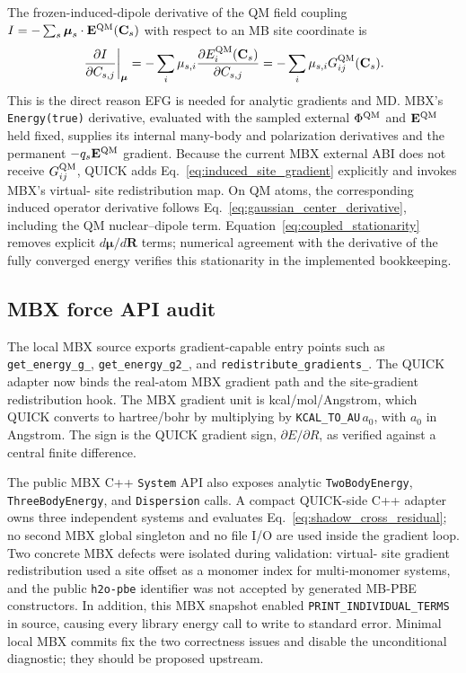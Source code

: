 \documentclass[11pt]{article}
\begin{document}
The frozen-induced-dipole derivative of the QM field coupling
$I=-\sum_s\boldsymbol{\mu}_s\cdot\mathbf{E}^{\rm QM}(\mathbf{C}_s)$ with
respect to an MB site coordinate is
\begin{equation}
  \left.
  \frac{\partial I}{\partial C_{s,j}}
  \right|_{\boldsymbol{\mu}}
  =
  -\sum_i \mu_{s,i}
  \frac{\partial E_i^{\rm QM}(\mathbf{C}_s)}{\partial C_{s,j}}
  =
  -\sum_i \mu_{s,i} G_{ij}^{\rm QM}(\mathbf{C}_s).
  \label{eq:induced_site_gradient}
\end{equation}
This is the direct reason EFG is needed for analytic gradients and MD.
MBX's \texttt{Energy(true)} derivative, evaluated with the sampled
external $\Phi^{\rm QM}$ and $\mathbf E^{\rm QM}$ held fixed, supplies
its internal many-body and polarization derivatives and the permanent
$-q_s\mathbf E^{\rm QM}$ gradient. Because the current MBX external ABI
does not receive $G_{ij}^{\rm QM}$, QUICK adds
Eq.~\ref{eq:induced_site_gradient} explicitly and invokes MBX's virtual-
site redistribution map. On QM atoms, the corresponding induced operator
derivative follows Eq.~\ref{eq:gaussian_center_derivative}, including the
QM nuclear--dipole term. Equation~\ref{eq:coupled_stationarity} removes
explicit $d\boldsymbol\mu/d\mathbf R$ terms; numerical agreement with the
derivative of the fully converged energy verifies this stationarity in the
implemented bookkeeping.

\subsection{MBX force API audit}

The local MBX source exports gradient-capable entry points such as
\texttt{get\_energy\_g\_}, \texttt{get\_energy\_g2\_}, and
\texttt{redistribute\_gradients\_}. The QUICK adapter now binds the
real-atom MBX gradient path and the site-gradient redistribution hook.
The MBX gradient unit is kcal/mol/Angstrom, which QUICK converts to
hartree/bohr by multiplying by \texttt{KCAL\_TO\_AU}$\,a_0$, with $a_0$
in Angstrom. The sign is the QUICK gradient sign, $\partial E/\partial R$,
as verified against a central finite difference.

The public MBX C++ \texttt{System} API also exposes analytic
\texttt{TwoBodyEnergy}, \texttt{ThreeBodyEnergy}, and
\texttt{Dispersion} calls. A compact QUICK-side C++ adapter owns three
independent systems and evaluates Eq.~\ref{eq:shadow_cross_residual}; no
second MBX global singleton and no file I/O are used inside the gradient
loop. Two concrete MBX defects were isolated during validation: virtual-
site gradient redistribution used a site offset as a monomer index for
multi-monomer systems, and the public \texttt{h2o-pbe} identifier was not
accepted by generated MB-PBE constructors. In addition, this MBX snapshot
enabled \texttt{PRINT\_INDIVIDUAL\_TERMS} in source, causing every library
energy call to write to standard error. Minimal local MBX commits fix the
two correctness issues and disable the unconditional diagnostic; they
should be proposed upstream.
\end{document}
